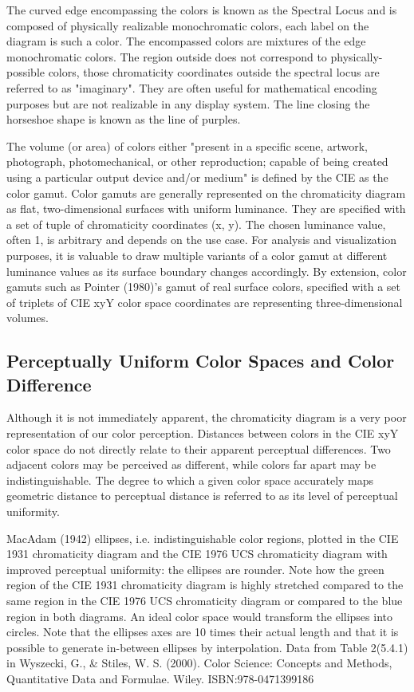 The curved edge encompassing the colors is known as the Spectral Locus and is composed of physically realizable monochromatic colors, each label on the diagram is such a color. The encompassed colors are mixtures of the edge monochromatic colors. The region outside does not correspond to physically-possible colors, those chromaticity coordinates outside the spectral locus are referred to as "imaginary". They are often useful for mathematical encoding purposes but are not realizable in any display system. The line closing the horseshoe shape is known as the line of purples.

The volume (or area) of colors either "present in a specific scene, artwork, photograph, photomechanical, or other reproduction; capable of being created using a particular output device and/or medium" is defined by the CIE as the color gamut. Color gamuts are generally represented on the chromaticity diagram as flat, two-dimensional surfaces with uniform luminance. They are specified with a set of tuple of chromaticity coordinates (x, y). The chosen luminance value, often 1, is arbitrary and depends on the use case. For analysis and visualization purposes, it is valuable to draw multiple variants of a color gamut at different luminance values as its surface boundary changes accordingly. By extension, color gamuts such as Pointer (1980)'s gamut of real surface colors, specified with a set of triplets of CIE xyY color space coordinates are representing three-dimensional volumes.

\subsection{Perceptually Uniform Color Spaces and Color Difference}

Although it is not immediately apparent, the chromaticity diagram is a very poor representation of our color perception. Distances between colors in the CIE xyY color space do not directly relate to their apparent perceptual differences. Two adjacent colors may be perceived as different, while colors far apart may be indistinguishable. The degree to which a given color space accurately maps geometric distance to perceptual distance is referred to as its level of perceptual uniformity.


MacAdam (1942) ellipses, i.e. indistinguishable color regions, plotted in the CIE 1931 chromaticity diagram and the CIE 1976 UCS chromaticity diagram with improved perceptual uniformity: the ellipses are rounder. Note how the green region of the CIE 1931 chromaticity diagram is highly stretched compared to the same region in the CIE 1976 UCS chromaticity diagram or compared to the blue region in both diagrams. An ideal color space would transform the ellipses into circles. Note that the ellipses axes are 10 times their actual length and that it is possible to generate in-between ellipses by interpolation. Data from Table 2(5.4.1) in Wyszecki, G., & Stiles, W. S. (2000). Color Science: Concepts and Methods, Quantitative Data and Formulae. Wiley. ISBN:978-0471399186

